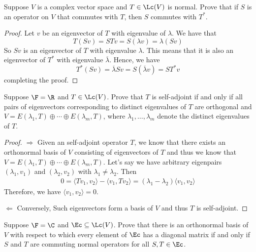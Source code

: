 \documentclass{extarticle}
\begin{document}
\begin{problem}{12}
    Suppose \(V\) is a complex vector space and \(T \in \Lc(V)\) is normal. Prove that if \(S\)
    is an operator on \(V\) that commutes with \(T\), then \(S\) commutes with \(T^*\).
\end{problem}

\begin{proof}
Let \(v\) be an eigenvector of \(T\) with eigenvalue of \(\lambda\). We have that
\[T(Sv) = STv = S (\lambda v) = \lambda(Sv)\]
So \(Sv\) is an eigenvector of \(T\) with eigenvalue \(\lambda\). This means that it is also an eigenvector
of \(T^*\) with eigenvalue \(\overline{\lambda}\). Hence, we have
\[T^*(Sv) = \overline{\lambda}Sv = S(\overline{\lambda} v) = S T^*v\]
completing the proof.
\end{proof}

\begin{problem}{14}
    Suppose \(\F = \R\) and \(T \in \Lc(V)\). Prove that \(T\) is self-adjoint if and only if
    all pairs of eigenvectors corresponding to distinct eigenvalues of \(T\) are orthogonal and
    \(V = E(\lambda_1, T) \oplus \cdots \oplus E(\lambda_m, T)\), where \(\lambda_1, \ldots, \lambda_m\)
    denote the distinct eigenvalues of \(T\).
\end{problem}

\begin{proof}
\(\Rightarrow\) Given an self-adjoint operator \(T\), we know that there exists an orthonormal basis
of \(V\) consisting of eigenvectors of \(T\) and thus we know that \(V = E(\lambda_1, T) \oplus
\cdots \oplus E(\lambda_m, T)\). Let's say we have arbitrary eigenpairs \((\lambda_1, v_1)\) and
\((\lambda_2, v_2)\) with \(\lambda_1 \neq \lambda_2\). Then
\begin{align*}
    0 = \langle Tv_1,v_2 \rangle - \langle v_1,Tv_2 \rangle
    = (\lambda_1 - \lambda_2) \langle v_1,v_2 \rangle
\end{align*}
Therefore, we have \(\langle v_1,v_2 \rangle = 0\).

\(\Leftarrow\) Conversely, Such eigenvectors form a basis of \(V\) and thus \(T\) is self-adjoint.
\end{proof}

\begin{problem}{16}
    Suppose \(\F = \C\) and \(\Ec \subseteq \Lc(V)\). Prove that there is an orthonormal basis of
    \(V\) with respect to which every element of \(\Ec\) has a diagonal matrix if and only if
    \(S\) and \(T\) are commuting normal operators for all \(S, T \in \Ec\).
\end{problem}
\end{document}
